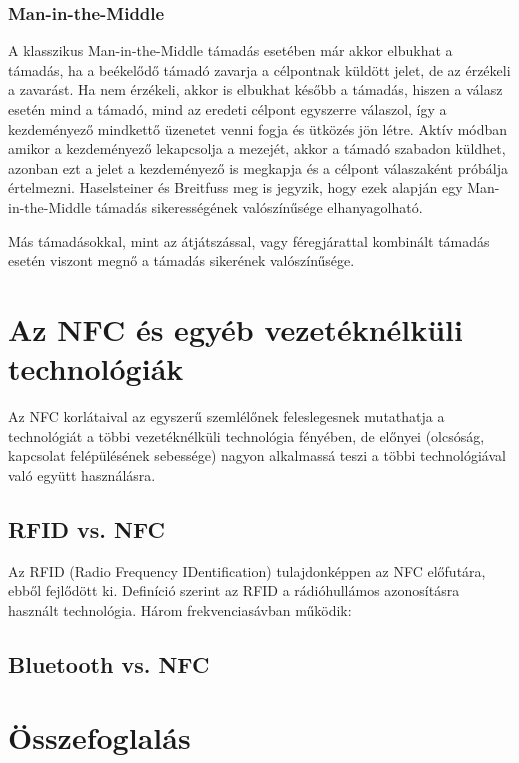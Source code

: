 \documentclass[12pt]{article}
\begin{document}
\subsubsection{Man-in-the-Middle}
A klasszikus Man-in-the-Middle támadás esetében már akkor elbukhat
a támadás, ha a beékelődő támadó zavarja a célpontnak küldött jelet, de az
érzékeli a zavarást. Ha nem érzékeli, akkor is elbukhat később a támadás, 
hiszen a válasz esetén mind a támadó, mind az eredeti célpont egyszerre válaszol,
így a kezdeményező mindkettő üzenetet venni fogja és ütközés jön létre.
Aktív módban amikor a kezdeményező lekapcsolja a mezejét, akkor a támadó szabadon
küldhet, azonban ezt a jelet a kezdeményező is megkapja és a célpont válaszaként
próbálja értelmezni. Haselsteiner és Breitfuss meg is jegyzik, hogy ezek alapján
egy Man-in-the-Middle támadás sikerességének valószínűsége elhanyagolható.

Más támadásokkal, mint az átjátszással, vagy féregjárattal kombinált támadás
esetén viszont megnő a támadás sikerének valószínűsége.

\section{Az NFC és egyéb vezetéknélküli technológiák}
Az NFC korlátaival az egyszerű szemlélőnek feleslegesnek mutathatja a 
technológiát a többi vezetéknélküli technológia fényében, de előnyei 
(olcsóság, kapcsolat felépülésének sebessége)
nagyon alkalmassá teszi a többi technológiával való együtt használásra.

\subsection{RFID vs. NFC}
Az RFID (Radio Frequency IDentification) tulajdonképpen az NFC előfutára, ebből
fejlődött ki. Definíció szerint az RFID a rádióhullámos azonosításra használt technológia. Három frekvenciasávban működik: 

\subsection{Bluetooth vs. NFC}

\section{Összefoglalás}
\end{document}
